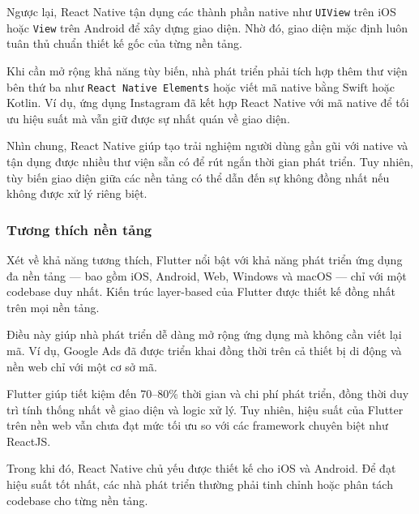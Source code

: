 \vspace{0.5em}

\indent Ngược lại, React Native tận dụng các thành phần native như \texttt{UIView} trên iOS hoặc \texttt{View} trên Android để xây dựng giao diện. Nhờ đó, giao diện mặc định luôn tuân thủ chuẩn thiết kế gốc của từng nền tảng.

\vspace{0.5em}

\indent Khi cần mở rộng khả năng tùy biến, nhà phát triển phải tích hợp thêm thư viện bên thứ ba như \texttt{React Native Elements} hoặc viết mã native bằng Swift hoặc Kotlin. Ví dụ, ứng dụng Instagram đã kết hợp React Native với mã native để tối ưu hiệu suất mà vẫn giữ được sự nhất quán về giao diện.

\vspace{0.5em}

\indent Nhìn chung, React Native giúp tạo trải nghiệm người dùng gần gũi với native và tận dụng được nhiều thư viện sẵn có để rút ngắn thời gian phát triển. Tuy nhiên, tùy biến giao diện giữa các nền tảng có thể dẫn đến sự không đồng nhất nếu không được xử lý riêng biệt.

\subsubsection{Tương thích nền tảng}

Xét về khả năng tương thích, Flutter nổi bật với khả năng phát triển ứng dụng đa nền tảng — bao gồm iOS, Android, Web, Windows và macOS — chỉ với một codebase duy nhất. Kiến trúc layer-based của Flutter được thiết kế đồng nhất trên mọi nền tảng.

\vspace{0.5em}

\indent Điều này giúp nhà phát triển dễ dàng mở rộng ứng dụng mà không cần viết lại mã. Ví dụ, Google Ads đã được triển khai đồng thời trên cả thiết bị di động và nền web chỉ với một cơ sở mã.

\vspace{0.5em}

\indent Flutter giúp tiết kiệm đến 70–80\% thời gian và chi phí phát triển, đồng thời duy trì tính thống nhất về giao diện và logic xử lý. Tuy nhiên, hiệu suất của Flutter trên nền web vẫn chưa đạt mức tối ưu so với các framework chuyên biệt như ReactJS.

\vspace{0.5em}

\indent Trong khi đó, React Native chủ yếu được thiết kế cho iOS và Android. Để đạt hiệu suất tốt nhất, các nhà phát triển thường phải tinh chỉnh hoặc phân tách codebase cho từng nền tảng.

